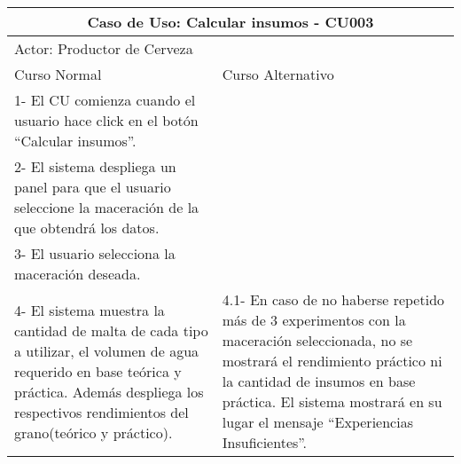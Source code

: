     
    \begin{minipage}{0.95\textwidth}
    \begin{center}
    \begin{tabularx}{\textwidth}{ | X | X |}
        \hline
        \multicolumn{2}{|c|}{\textbf{Caso de Uso: Calcular insumos - CU003}} \\
        \hline
        \multicolumn{2}{|l|}{Actor: Productor de Cerveza} \\
        \hline
        Curso Normal & Curso Alternativo \\
        \hline
        1- El CU comienza cuando el usuario hace click en el botón “Calcular insumos”. & \\
        \hline
        2- El sistema despliega un panel para que el usuario seleccione la maceración de la que obtendrá los datos. &  \\
        \hline
        3- El usuario selecciona la maceración deseada. &  \\
        \hline
        4- El sistema muestra la cantidad de malta de cada tipo a utilizar, el volumen de agua requerido en base teórica y práctica. Además despliega los respectivos rendimientos del grano(teórico y práctico). & 4.1- En caso de no haberse repetido más de 3 experimentos con la maceración seleccionada, no se mostrará el rendimiento práctico ni la cantidad de insumos en base práctica. El sistema mostrará en su lugar el mensaje “Experiencias Insuficientes”.  \\
        \hline
        
    \end{tabularx}
    \label{CU003}
    \end{center}
    \end{minipage}
    
